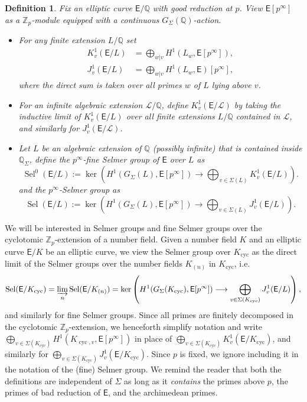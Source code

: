 \documentclass{amsart}
\newtheorem{definition}[theorem]{Definition}
\numberwithin{equation}{section}
\theoremstyle{remark}
\newcommand{\cyc}{\operatorname{cyc}}
\newcommand{\Sel}{\operatorname{Sel}}
\newcommand{\Zp}{\mathbb{Z}_p}
\newcommand{\Q}{\mathbb{Q}}
\newcommand{\EC}{\mathsf{E}}
\newcommand{\cL}{\mathcal{L}}
\theoremstyle{plain} %
\begin{document}
\begin{definition}
Fix an elliptic curve $\EC/\Q$ with good reduction at $p$.
View $\EC[p^\infty]$ as a $\Zp$-module equipped with a continuous $G_{\Sigma}(\Q)$-action.
\begin{itemize}
 \item[\textup{(}i\textup{)}] For any finite extension $L/\Q$ set
\begin{align*}
K^1_v\left(\EC/L\right) &= \bigoplus_{w|v} H^1\left(L_w, \EC[p^\infty]\right),\\
J^1_v\left(\EC/L\right) &= \bigoplus_{w|v} H^1\left(L_w, \EC\right)[p^\infty],
\end{align*}
where the direct sum is taken over all primes $w$ of $L$ lying above $v$.
\item[\textup{(}ii\textup{)}]For an infinite algebraic extension $\cL/\Q$, define $K_v^1\left(\EC/\cL\right)$ by taking the inductive limit of $K_v^1\left(\EC/L\right)$ over all finite extensions $L/\Q$ contained in $\cL$, and similarly for $J_v^1(\EC/\cL)$.
\item[\textup{(}iii\textup{)}]Let $L$ be an algebraic extension of $\Q$ (possibly infinite) that is contained inside $\Q_\Sigma$, define the \emph{$p^\infty$-fine Selmer group} of $\EC$ over $L$ as
\[
\Sel^0(\EC/L):=\ker\left(H^1(G_{\Sigma}(L),\EC[p^\infty])\longrightarrow\bigoplus_{v\in \Sigma(L)} K^1_v(\EC/L)\right).
\]
and the \emph{$p^\infty$-Selmer group} as
\[
\Sel(\EC/L):=\ker\left(H^1(G_{\Sigma}(L),\EC[p^\infty])\longrightarrow\bigoplus_{v\in \Sigma(L)} J^1_v(\EC/L)\right).
\]
\end{itemize}
\end{definition}

We will be interested in Selmer groups and fine Selmer groups over the cyclotomic $\Zp$-extension of a number field.
Given a number field $K$ and an elliptic curve $\EC/K$ be an elliptic curve, we view the Selmer group over $K_{\cyc}$ as the direct limit of the Selmer groups over the number fields $K_{(n)}$ in $K_{\cyc}$, i.e.
\[
\Sel(\EC/K_{\cyc})=\varinjlim_n \Sel(\EC/K_{(n)}) = \ker\left(H^1(G_{\Sigma}(K_{\cyc}),\EC[p^\infty])\longrightarrow\bigoplus_{v\in \Sigma(K_{\cyc})} J^1_v(\EC/L)\right),
\]
and similarly for fine Selmer groups.
Since all primes are finitely decomposed in the cyclotomic $\Zp$-extension, we henceforth simplify notation and write $\bigoplus_{v\in {\Sigma}(K_{\cyc})} H^1\left(K_{\cyc,v},\EC[p^\infty]\right)$ in place of $\bigoplus_{v\in {\Sigma}(K_{\cyc})} K^1_v(\EC/K_{\cyc})$, and similarly for $\bigoplus_{v\in {\Sigma}(K_{\cyc})} J^1_v(\EC/K_{\cyc})$.
Since $p$ is fixed, we ignore including it in the notation of the (fine) Selmer group.
We remind the reader that both the definitions are independent of ${\Sigma}$ as long as it \emph{contains} the primes above $p$, the primes of bad reduction of $\EC$, and the archimedean primes.
\end{document}
